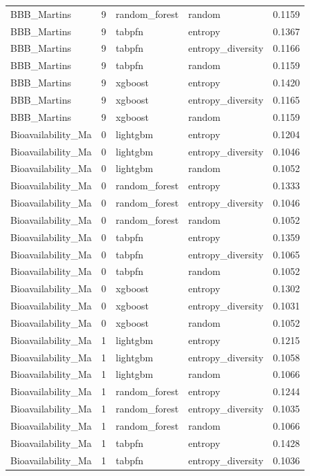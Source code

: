 \begin{tabular}{lrllr}
BBB_Martins & 9 & random_forest & random & 0.1159 \\
BBB_Martins & 9 & tabpfn & entropy & 0.1367 \\
BBB_Martins & 9 & tabpfn & entropy_diversity & 0.1166 \\
BBB_Martins & 9 & tabpfn & random & 0.1159 \\
BBB_Martins & 9 & xgboost & entropy & 0.1420 \\
BBB_Martins & 9 & xgboost & entropy_diversity & 0.1165 \\
BBB_Martins & 9 & xgboost & random & 0.1159 \\
Bioavailability_Ma & 0 & lightgbm & entropy & 0.1204 \\
Bioavailability_Ma & 0 & lightgbm & entropy_diversity & 0.1046 \\
Bioavailability_Ma & 0 & lightgbm & random & 0.1052 \\
Bioavailability_Ma & 0 & random_forest & entropy & 0.1333 \\
Bioavailability_Ma & 0 & random_forest & entropy_diversity & 0.1046 \\
Bioavailability_Ma & 0 & random_forest & random & 0.1052 \\
Bioavailability_Ma & 0 & tabpfn & entropy & 0.1359 \\
Bioavailability_Ma & 0 & tabpfn & entropy_diversity & 0.1065 \\
Bioavailability_Ma & 0 & tabpfn & random & 0.1052 \\
Bioavailability_Ma & 0 & xgboost & entropy & 0.1302 \\
Bioavailability_Ma & 0 & xgboost & entropy_diversity & 0.1031 \\
Bioavailability_Ma & 0 & xgboost & random & 0.1052 \\
Bioavailability_Ma & 1 & lightgbm & entropy & 0.1215 \\
Bioavailability_Ma & 1 & lightgbm & entropy_diversity & 0.1058 \\
Bioavailability_Ma & 1 & lightgbm & random & 0.1066 \\
Bioavailability_Ma & 1 & random_forest & entropy & 0.1244 \\
Bioavailability_Ma & 1 & random_forest & entropy_diversity & 0.1035 \\
Bioavailability_Ma & 1 & random_forest & random & 0.1066 \\
Bioavailability_Ma & 1 & tabpfn & entropy & 0.1428 \\
Bioavailability_Ma & 1 & tabpfn & entropy_diversity & 0.1036 \\

\end{tabular}
